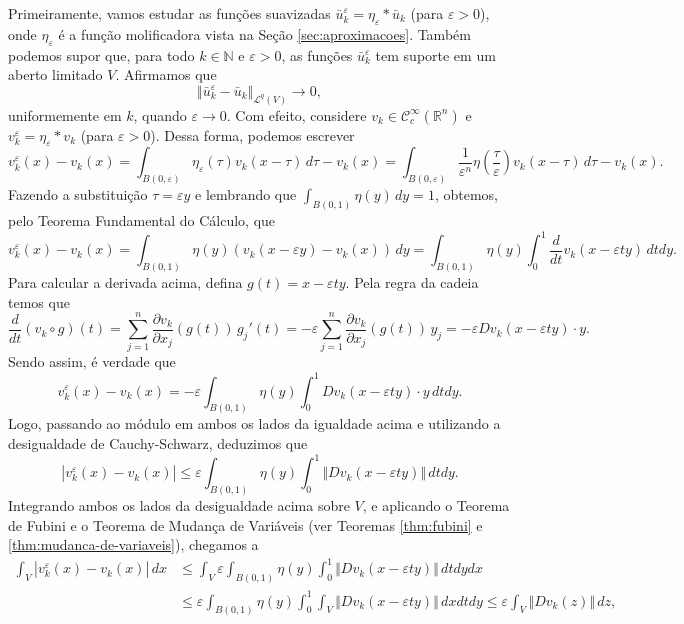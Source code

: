 \documentclass[a4paper, 11pt]{book}
\theoremstyle{definition}
\newcommand{\bN}{\mathbb{N}}
\newcommand{\bR}{\mathbb{R}}
\newcommand{\cC}{\mathcal{C}}
\newcommand{\cL}{\mathcal{L}}
\begin{document}
\begin{prf}
    Primeiramente, vamos estudar as funções suavizadas $\bar u_k^\varepsilon = \eta_\varepsilon * \bar u_k$ (para $\varepsilon > 0$), onde $\eta_\varepsilon$ é a função molificadora vista na Seção \ref{sec:aproximacoes}.
    Também podemos supor que, para todo $k \in \bN$ e $\varepsilon > 0$, as funções $\bar u_k^\varepsilon$ tem suporte em um aberto limitado $V$.
    Afirmamos que
    \[
        \Vert \bar u_k^\varepsilon - \bar u_k \Vert_{\cL^q(V)} \to 0,
    \]
    uniformemente em $k$, quando $\varepsilon \to 0$.
    Com efeito, considere $v_k \in \cC^{\infty}_c(\bR^n)$ e $v_k^\varepsilon = \eta_\varepsilon * v_k$ (para $\varepsilon > 0$).
    Dessa forma, podemos escrever
    \[
        v_k^\varepsilon(x) - v_k(x) = \int_{B(0,\varepsilon)} \eta_\varepsilon(\tau) v_k (x - \tau) \,d\tau - v_k(x)  = \int_{B(0,\varepsilon)} \frac{1}{\varepsilon^n} \eta \left( \frac{\tau}{\varepsilon} \right) v_k (x - \tau) \,d\tau - v_k(x).
    \]
    Fazendo a substituição $\tau = \varepsilon y$ e lembrando que $\int_{B(0,1)} \eta(y) \,dy = 1$, obtemos, pelo Teorema Fundamental do Cálculo, que
    \[
        v_k^\varepsilon(x) - v_k(x) = \int_{B(0,1)} \eta(y) \left( v_k(x - \varepsilon y) - v_k(x) \right) \,dy = \int_{B(0,1)} \eta(y) \int_0^1 \frac{d}{dt}v_k(x - \varepsilon t y) \,dt dy.
    \]
    Para calcular a derivada acima, defina $g(t) = x - \varepsilon t y$. Pela regra da cadeia temos que
    \[
        \frac{d}{dt} (v_k \circ g)(t) = \sum_{j=1}^n \dfrac{\partial v_k}{\partial x_j} (g(t)) \, g_j'(t) = -\varepsilon\sum_{j=1}^{n} \dfrac{\partial v_k}{\partial x_j}(g(t)) \,y_j = -\varepsilon Dv_k(x - \varepsilon ty) \cdot y.
    \]
    Sendo assim, é verdade que
    \[
        v_k^\varepsilon(x) - v_k(x) = -\varepsilon \int_{B(0,1)} \eta(y) \int_0^1 Dv_k(x - \varepsilon ty) \cdot y \,dtdy.
    \]
    Logo, passando ao módulo em ambos os lados da igualdade acima e utilizando a desigualdade de Cauchy-Schwarz, deduzimos que
    \[
        |v_k^\varepsilon(x) - v_k(x)| \leqslant \varepsilon \int_{B(0,1)} \eta(y) \int_0^1 \Vert Dv_k(x - \varepsilon ty) \Vert \,dtdy.
    \]
    Integrando ambos os lados da desigualdade acima sobre $V$, e aplicando o Teorema de Fubini e o Teorema de Mudança de Variáveis (ver Teoremas \ref{thm:fubini} e \ref{thm:mudanca-de-variaveis}), chegamos a
    \[
        \begin{aligned}
            \int_{V} |v_k^\varepsilon(x) - v_k(x)|\,dx &\leqslant \int_{V} \varepsilon \int_{B(0,1)} \eta(y) \int_0^1 \Vert Dv_k(x - \varepsilon ty) \Vert \,dtdydx\\
            &\leqslant \varepsilon \int_{B(0,1)} \eta(y) \int_0^1 \int_{V} \Vert Dv_k(x - \varepsilon ty) \Vert \,dxdtdy \leqslant \varepsilon \int_{V} \Vert Dv_k(z) \Vert    \,dz,

\end{aligned}\]
\end{prf}
\end{document}
